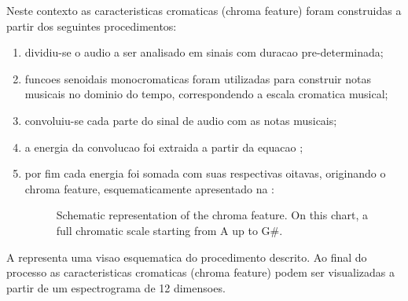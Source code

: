\documentclass{article}
\begin{document}
	Neste contexto as caracteristicas cromaticas (chroma feature) foram construidas a partir dos seguintes procedimentos:
	\begin{enumerate}
		\item dividiu-se o audio a ser analisado em sinais com duracao pre-determinada;
		\item funcoes senoidais monocromaticas foram utilizadas para construir notas musicais no dominio do tempo, correspondendo a escala cromatica musical; 
		\item convoluiu-se cada parte do sinal de audio com as notas musicais;
		\item a energia da convolucao foi extraida a partir da equacao ;
		\item por fim cada energia foi somada com suas respectivas oitavas, originando o chroma feature, esquematicamente apresentado na :

		\begin{figure}[h]
		 \centerline{}
		 \caption{Schematic representation of the chroma feature. On this chart, a full chromatic scale starting from A up to G\#.}
		 \label{fig:chroma_feature}
		\end{figure}

	\end{enumerate}

	A  representa uma visao esquematica do procedimento descrito. Ao final do processo as caracteristicas cromaticas (chroma feature) podem ser visualizadas a partir de um espectrograma de 12 dimensoes.
\end{document}
